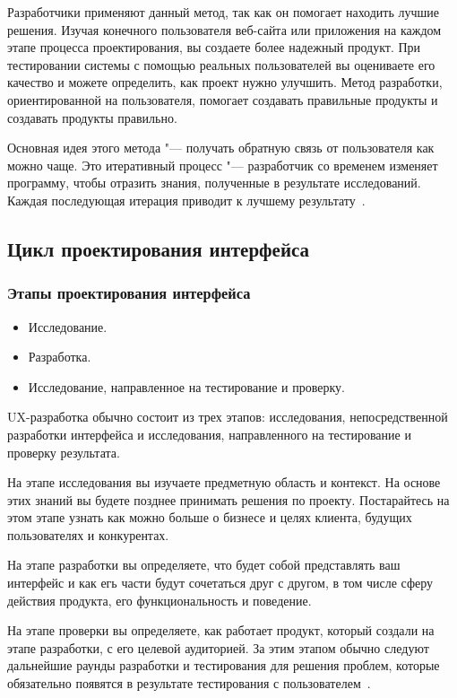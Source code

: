 \documentclass{../industrial-development}
\begin{document}
Разработчики применяют данный метод, так как он помогает находить лучшие решения. Изучая конечного пользователя веб-сайта или приложения на каждом этапе процесса проектирования, вы создаете более надежный продукт. При тестировании системы с помощью реальных пользователей вы оцениваете его качество и можете определить, как проект нужно улучшить. Метод разработки, ориентированной на пользователя, помогает создавать правильные продукты и создавать продукты правильно.

Основная идея этого метода "--- получать обратную связь от пользователя как можно чаще. Это итеративный процесс "--- разработчик со временем изменяет программу, чтобы отразить знания, полученные в результате исследований. Каждая последующая итерация приводит к лучшему результату~\cite[с.~40--41]{Allen}.

\subsection{Цикл проектирования интерфейса}

\begin{frame} \frametitle{Этапы проектирования интерфейса}
  \begin{itemize}
   \item Исследование.
   \item Разработка.
   \item Исследование, направленное на тестирование и проверку.
  \end{itemize}
\end{frame}

\lecturenotes

UX-разработка обычно состоит из трех этапов: исследования, непосредственной разработки интерфейса и исследования, направленного на тестирование и проверку результата.

На этапе исследования вы изучаете предметную область и контекст. На основе этих знаний вы будете позднее принимать решения по проекту. Постарайтесь на этом этапе узнать как можно больше о бизнесе и целях клиента, будущих пользователях и конкурентах.

На этапе разработки вы определяете, что будет собой представлять ваш интерфейс и как егь части будут сочетаться друг с другом, в том числе сферу действия продукта, его функциональность и поведение.

На этапе проверки вы определяете, как работает продукт, который создали на этапе разработки, с его целевой аудиторией. За этим этапом обычно следуют дальнейшие раунды разработки и тестирования для решения проблем, которые обязательно появятся в результате тестирования с пользователем~\cite[с.~61--62]{Allen}.
\end{document}
